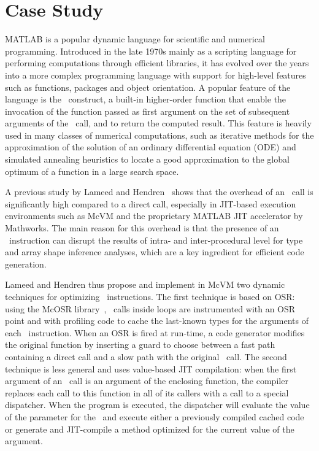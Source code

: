 
\section{Case Study}
\label{case-study}

MATLAB is a popular dynamic language for scientific and numerical programming. Introduced in the late 1970s mainly as a scripting language for performing computations through efficient libraries, it has evolved over the years into a more complex programming language with support for high-level features such as functions, packages and object orientation. A popular feature of the language is the \feval\ construct, a built-in higher-order function that enable the invocation of the function passed as first argument on the set of subsequent arguments of the \feval\ call, and to return the computed result. This feature is heavily used in many classes of numerical computations, such as iterative methods for the approximation of the solution of an ordinary differential equation (ODE) and simulated annealing heuristics to locate a good approximation to the global optimum of a function in a large search space.

A previous study by Lameed and Hendren~\cite{lameed2013feval} shows that the overhead of an \feval\ call is significantly high compared to a direct call, especially in JIT-based execution environments such as McVM and the proprietary MATLAB JIT accelerator by Mathworks. The main reason for this overhead is that the presence of an \feval\ instruction can disrupt the results of intra- and inter-procedural level for type and array shape inference analyses, which are a key ingredient for efficient code generation.

Lameed and Hendren thus propose and implement in McVM two dynamic techniques for optimizing \feval\ instructions. The first technique is based on OSR: using the McOSR library~\cite{lameed2013modular}, \feval\ calls inside loops are instrumented with an OSR point and with profiling code to cache the last-known types for the arguments of each \feval\ instruction. When an OSR is fired at run-time, a code generator modifies the original function by inserting a guard to choose between a fast path containing a direct call and a slow path with the original \feval\ call. The second technique is less general and uses value-based JIT compilation: when the first argument of an \feval\ call is an argument of the enclosing function, the compiler replaces each call to this function in all of its callers with a call to a special dispatcher. When the program is executed, the dispatcher will evaluate the value of the parameter for the \feval\ and execute either a previously compiled cached code or generate and JIT-compile a method optimized for the current value of the argument.

